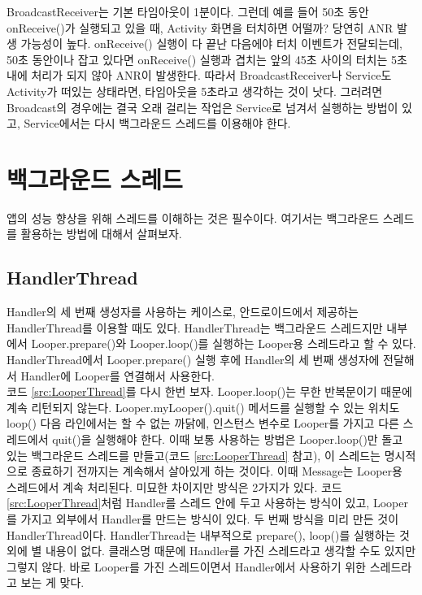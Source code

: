 BroadcastReceiver는 기본 타임아웃이 1분이다. 
그런데 예를 들어 50초 동안 onReceive()가 실행되고 있을 때, Activity 화면을 터치하면 어떨까? 
당연히 ANR 발생 가능성이 높다. onReceive() 실행이 다 끝난 다음에야 터치 이벤트가 전달되는데, 50초 동안이나 잡고 있다면 onReceive() 실행과 겹치는 앞의 45초 사이의 터치는 5초 내에 처리가 되지 않아 ANR이 발생한다.
따라서 BroadcastReceiver나 Service도 Activity가 떠있는 상태라면, 타임아웃을 5초라고 생각하는 것이 낫다.
그러려면 Broadcast의 경우에는 결국 오래 걸리는 작업은 Service로 넘겨서 실행하는 방법이 있고, Service에서는 다시 백그라운드 스레드를 이용해야 한다.\\


\chapter{백그라운드 스레드}
앱의 성능 향상을 위해 스레드를 이해하는 것은 필수이다. 여기서는 백그라운드 스레드를 활용하는 방법에 대해서 살펴보자.

\section{HandlerThread}
Handler의 세 번째 생성자를 사용하는 케이스로, 안드로이드에서 제공하는 HandlerThread를 이용할 때도 있다.
HandlerThread는 백그라운드 스레드지만 내부에서 Looper.prepare()와 Looper.loop()를 실행하는 Looper용 스레드라고 할 수 있다.
HandlerThread에서 Looper.prepare() 실행 후에 Handler의 세 번째 생성자에 전달해서 Handler에 Looper를 연결해서 사용한다.\\

코드 \ref{src:LooperThread}를 다시 한번 보자. Looper.loop()는 무한 반복문이기 때문에 계속 리턴되지 않는다.
Looper.myLoop\-er().quit() 메서드를 실행할 수 있는 위치도 loop() 다음 라인에서는 할 수 없는 까닭에, 인스턴스 변수로 Looper를 가지고 다른 스레드에서 quit()을 실행해야 한다.
이때 보통 사용하는 방법은 Looper.loop()만 돌고 있는 백그라운드 스레드를 만들고(코드 \ref{src:LooperThread} 참고), 이 스레드는 명시적으로 종료하기 전까지는 계속해서 살아있게 하는 것이다. 
이때 Message는 Looper용 스레드에서 계속 처리된다.
미묘한 차이지만 방식은 2가지가 있다. 코드 \ref{src:LooperThread}처럼 Handler를 스레드 안에 두고 사용하는 방식이 있고, Looper를 가지고 외부에서 Handler를 만드는 방식이 있다. 
두 번째 방식을 미리 만든 것이 HandlerThread이다.
HandlerThread는 내부적으로 prepare(), loop()를 실행하는 것 외에 별 내용이 없다. 
클래스명 때문에 Handler를 가진 스레드라고 생각할 수도 있지만 그렇지 않다. 바로 Looper를 가진 스레드이면서 Handler에서 사용하기 위한 스레드라고 보는 게 맞다.\\

